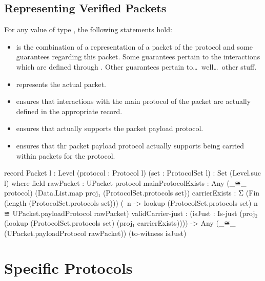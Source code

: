 \documentclass{report}
\begin{document}
\chapter{Representing Verified Packets}
For any value  of type   , the following statements hold:
  \begin{itemize}
  \item {} is the combination of a representation of a packet of the  protocol and some guarantees regarding this packet.  Some guarantees pertain to the interactions which are defined through .  Other guarantees pertain to\ldots{}\ well\ldots{}\ other stuff.
  \item {}  represents the actual packet.
  \item {}  ensures that interactions with the main protocol of the packet are actually defined in the appropriate  record.
  \item {}  ensures that  actually supports the packet payload protocol.
  \item {}  ensures that thr packet payload protocol actually supports being carried within packets for the  protocol.
\end{itemize}

\begin{code}
  record Packet {l : Level}
                (protocol : Protocol l)
                (set : ProtocolSet l) :
                Set (Level.suc l)
    where
    field
      rawPacket : UPacket protocol
      mainProtocolExists :
        Any (_≅_ protocol)
            (Data.List.map proj₁ (ProtocolSet.protocols set))
      carrierExists :
        Σ (Fin (length (ProtocolSet.protocols set)))
          (\ n -> lookup (ProtocolSet.protocols set) n ≅
                 UPacket.payloadProtocol rawPacket)
      validCarrier-just  :
        (isJust : Is-just (proj₂ (lookup (ProtocolSet.protocols set)
                                         (proj₁ carrierExists)))) ->
        Any (_≅_ (UPacket.payloadProtocol rawPacket)) (to-witness isJust)
\end{code}

\part{Specific Protocols}
\end{document}
